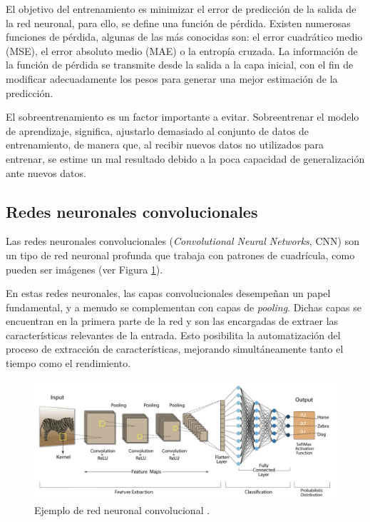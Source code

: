 El objetivo del entrenamiento es minimizar el error de predicción de la salida de la red neuronal, para ello, se define una función de pérdida. Existen numerosas funciones de pérdida, algunas de las más conocidas son: el error cuadrático medio (MSE), el error absoluto medio (MAE) o la entropía cruzada. La información de la función de pérdida se transmite desde la salida a la capa inicial, con el fin de modificar adecuadamente los pesos para generar una mejor estimación de la predicción.

El sobreentrenamiento es un factor importante a evitar. Sobreentrenar el modelo de aprendizaje, significa, ajustarlo demasiado al conjunto de datos de entrenamiento, de manera que, al recibir nuevos datos no utilizados para entrenar, se estime un mal resultado debido a la poca capacidad de generalización ante nuevos datos.


\subsection{Redes neuronales convolucionales}
Las redes neuronales convolucionales (\textit{Convolutional Neural Networks}, CNN) \cite{35, 36, 37} son un tipo de red neuronal profunda que trabaja con patrones de cuadrícula, como pueden ser imágenes (ver Figura \ref{fig6}).

En estas redes neuronales, las capas convolucionales desempeñan un papel fundamental, y a menudo se complementan con capas de \textit{pooling}. Dichas capas se encuentran en la primera parte de la red y son las encargadas de extraer las características relevantes de la entrada. Esto posibilita la automatización del proceso de extracción de características, mejorando simultáneamente tanto el tiempo como el rendimiento.

\begin{figure}[h]
	\centering
	\includegraphics[scale=0.5]{imagenes/cap2/cnn.png}
	\caption[Ejemplo de red neuronal convolucional.]{Ejemplo de red neuronal convolucional \cite{41}.}
	\label{fig6}
\end{figure}

